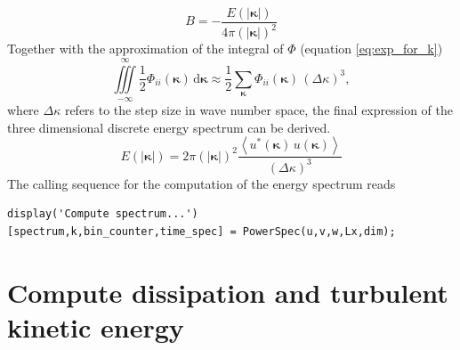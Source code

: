 \documentclass[preprint,12pt,ntfdMod]{elsarticle}
\begin{document}
\begin{par}
  \begin{equation}
      B=-\frac{E(|\boldsymbol\kappa|)}{4\pi(|\boldsymbol\kappa|)^2}
  \end{equation}
Together with the approximation of the integral of $\Phi$
(equation \eqref{eq:exp_for_k})
  \begin{equation}
      \iiint\limits_{-\infty}^{\infty}\frac{1}{2}\Phi_{ii}(\boldsymbol\kappa)\,\mathrm{d}\boldsymbol\kappa
      \approx\frac{1}{2}\sum\limits_{\boldsymbol\kappa}\Phi_{ii}(\boldsymbol\kappa)\,(\Delta\kappa)^3,
  \end{equation}
where $\Delta\kappa$ refers to the step size in wave number space,
the final expression of the three dimensional discrete energy spectrum can be derived.
  \begin{equation}
      E(|\boldsymbol\kappa|)=2\pi(|\boldsymbol\kappa|)^2\frac{\left<u^{*}
      (\boldsymbol\kappa)\,u(\boldsymbol\kappa)\right>}{(\Delta\kappa)^3}
  \end{equation}
The calling sequence for the computation of the energy spectrum reads

\end{par} \vspace{1em}
\begin{verbatim}
display('Compute spectrum...')
[spectrum,k,bin_counter,time_spec] = PowerSpec(u,v,w,Lx,dim);
\end{verbatim}
\begin{par}



\end{par} \vspace{1em}


\section{Compute dissipation and turbulent kinetic energy}
\end{document}
